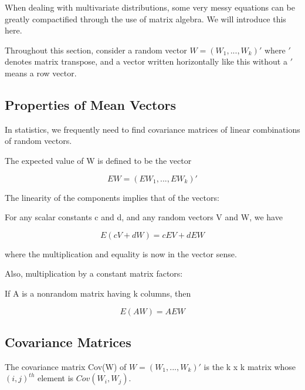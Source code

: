 When dealing with multivariate distributions, some very messy equations
can be greatly compactified through the use of matrix algebra.  We will
introduce this here.

Throughout this section, consider a random vector $W = (W_1,...,W_k)'$
where $'$ denotes matrix transpose, and a vector written horizontally like
this without a $'$ means a row vector.

\subsection{Properties of Mean Vectors}

In statistics, we frequently need to find covariance matrices of linear
combinations of random vectors.

\begin{definition}

The expected value of W is defined to be the vector

\begin{equation}
\label{evalrandvec}
EW = (EW_1,...,EW_k)'
\end{equation}

\end{definition}

The linearity of the components implies that of the vectors:  

For any scalar constants c and d, and any random vectors V and W, we
have

\begin{equation}
E(cV+dW) = c EV + d EW
\end{equation}

where the multiplication and equality is now in the vector sense.

Also, multiplication by a constant matrix factors:  

If A is a nonrandom matrix having k columns, then

\begin{equation}
\label{eaw}
E(AW) = A EW
\end{equation}

\subsection{Covariance Matrices}

\begin{definition}
The covariance matrix Cov(W) of $W = (W_1,...,W_k)'$
is the k x k matrix whose $(i,j)^{th}$ element is $Cov(W_i,W_j)$.  
\end{definition}

